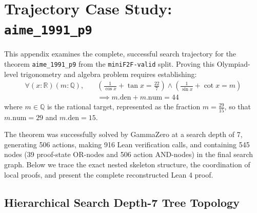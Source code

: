 \section{Trajectory Case Study: \texttt{aime\_1991\_p9}}
\label{sec:case-study}
\label{app:case-study-aime-1991-p9}

This appendix examines the complete, successful search trajectory for the theorem \texttt{aime\_1991\_p9} from the \texttt{miniF2F-valid} split. Proving this Olympiad-level trigonometry and algebra problem requires establishing:
\begin{align*}
\forall (x : \mathbb{R}) (m : \mathbb{Q}), \quad 
&\left( \frac{1}{\cos x} + \tan x = \frac{22}{7} \right) \land \left( \frac{1}{\sin x} + \cot x = m \right) \\
&\implies m.\mathrm{den} + m.\mathrm{num} = 44
\end{align*}
where $m \in \mathbb{Q}$ is the rational target, represented as the fraction $m = \frac{29}{15}$, so that $m.\mathrm{num} = 29$ and $m.\mathrm{den} = 15$. 

The theorem was successfully solved by GammaZero at a search depth of 7, generating 506 actions,
making 916 Lean verification calls, and containing 545 nodes (39 proof-state OR-nodes and 506 action
AND-nodes) in the final search graph. Below we trace the exact nested skeleton structure, the
coordination of local proofs, and present the complete reconstructed Lean 4 proof.

\subsection{Hierarchical Search Depth-7 Tree Topology}


